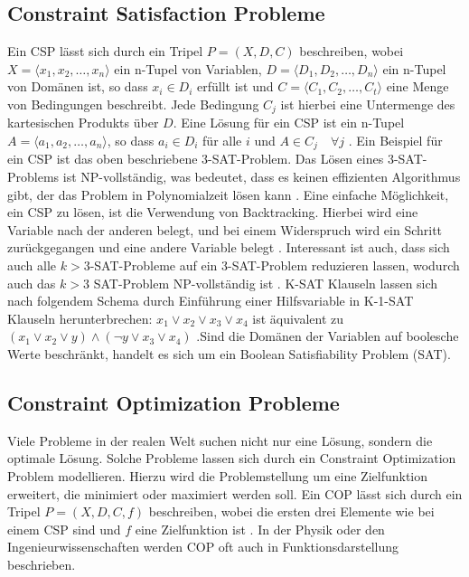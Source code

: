 \subsection{Constraint Satisfaction Probleme}
\label{sec:Constraint-Satisfaction-Probleme}

Ein CSP lässt sich durch ein Tripel \(P=(X,D,C)\) beschreiben, wobei \(X=\langle
x_{1},x_{2},\ldots,x_{n}\rangle\) ein n-Tupel von Variablen, \(D=\langle
D_{1},D_{2},\ldots,D_{n}\rangle\) ein n-Tupel von Domänen ist, so dass \(x_i\in
D_{i}\) erfüllt ist und \(C=\langle C_1,C_2,\ldots,C_t\rangle\) eine Menge von
Bedingungen beschreibt. Jede Bedingung \(C_j\) ist hierbei eine Untermenge des
kartesischen Produkts über \(D\). Eine Lösung für ein CSP ist ein n-Tupel
\(A=\langle a_1,a_2,\ldots,a_n\rangle \), so dass \(a_i\in D_i\) für alle \(i\)
und \(A \in C_j \quad \forall j\) \cite[16]{rossi06bo}. Ein Beispiel für ein CSP
ist das oben beschriebene 3-SAT-Problem. Das Lösen eines 3-SAT-Problems ist
NP-vollständig, was bedeutet, dass es keinen effizienten Algorithmus gibt, der
das Problem in Polynomialzeit lösen kann \cite[17]{rossi06bo}. Eine einfache
Möglichkeit, ein CSP zu lösen, ist die Verwendung von Backtracking. Hierbei wird
eine Variable nach der anderen belegt, und bei einem Widerspruch wird ein
Schritt zurückgegangen und eine andere Variable belegt \cite[85]{rossi06bo}.
Interessant ist auch, dass sich auch alle \(k>3\)-SAT-Probleme auf ein
3-SAT-Problem reduzieren lassen, wodurch auch das \(k>3\) SAT-Problem
NP-vollständig ist \cite[206]{gritz13bo}. \mbox{K-SAT} Klauseln lassen sich nach
folgendem Schema durch Einführung einer Hilfsvariable in \mbox{K-1-SAT} Klauseln
herunterbrechen: $x_1 \vee x_2 \vee x_3 \vee x_4$ ist äquivalent zu $(x_1 \vee
x_2 \vee y) \wedge (\lnot y \vee x_3 \vee x_4)$ .Sind die Domänen der Variablen
auf boolesche Werte beschränkt, handelt es sich um ein Boolean Satisfiability
Problem (SAT).


\subsection{Constraint Optimization Probleme}
\label{sec:Constraint-Optimization-Probleme}

Viele Probleme in der realen Welt suchen nicht nur eine Lösung, sondern die
optimale Lösung. Solche Probleme lassen sich durch ein Constraint Optimization
Problem modellieren. Hierzu wird die Problemstellung um eine Zielfunktion
erweitert, die minimiert oder maximiert werden soll. Ein COP lässt sich durch
ein Tripel \(P=(X,D,C,f)\) beschreiben, wobei die ersten drei Elemente wie bei
einem CSP sind und \(f\) eine Zielfunktion ist \cite[22]{amadi15jo}. In der
Physik oder den Ingenieurwissenschaften werden COP oft auch in
Funktionsdarstellung beschrieben.

